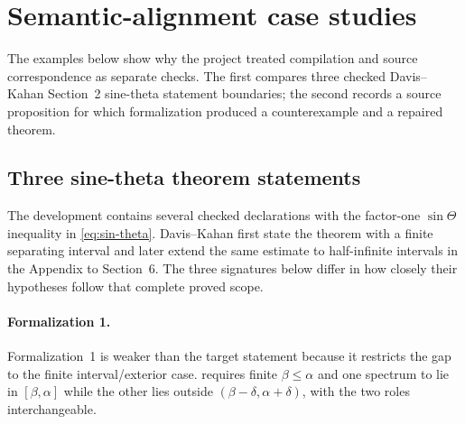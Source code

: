 \documentclass{article}
\begin{document}
\section{Semantic-alignment case studies}
\label{sec:cases}

The examples below show why the project treated compilation and source
correspondence as separate checks.  The first compares three checked
Davis--Kahan Section~2 sine-theta statement boundaries; the second records a
source proposition for which formalization produced a counterexample and a
repaired theorem.

\subsection{Three sine-theta theorem statements}
\label{sec:scope-mismatch}

The development contains several checked declarations with the factor-one
$\sin\Theta$ inequality in \cref{eq:sin-theta}.  Davis--Kahan first state the
theorem with a finite separating interval and later extend the same estimate to
half-infinite intervals in the Appendix to Section~6.  The three signatures
below differ in how closely their hypotheses follow that complete proved scope.

\paragraph{Formalization 1.}
Formalization~1 is weaker than the target statement because it restricts the
gap to the finite interval/exterior case.  
requires finite $\beta\le\alpha$ and one spectrum to lie in $[\beta,\alpha]$
while the other lies outside $(\beta-\delta,\alpha+\delta)$, with the two roles
interchangeable.
\end{document}
